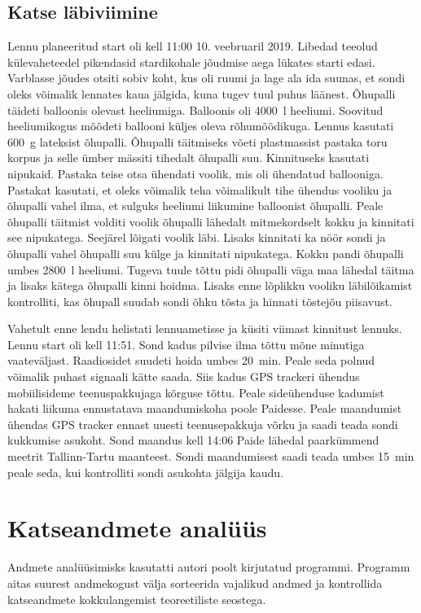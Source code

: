 \documentclass{trkut}%
\begin{document}
\section{Katse läbiviimine}
Lennu planeeritud start oli kell 11:00 10. veebruaril 2019. Libedad teeolud külevaheteedel pikendasid stardikohale jõudmise aega lükates starti edasi. Varblasse jõudes otsiti sobiv koht, kus oli ruumi ja lage ala ida suunas, et sondi oleks võimalik lennates kaua jälgida, kuna tugev tuul puhus läänest. Õhupalli täideti balloonis olevast heeliumiga. Balloonis oli \SI{4000}{l} heeliumi. Soovitud heeliumikogus mõõdeti ballooni küljes oleva rõhumõõdikuga. Lennus kasutati \SI{600}{g} lateksist õhupalli. Õhupalli täitmiseks võeti plastmassist pastaka toru korpus ja selle ümber mässiti tihedalt õhupalli suu. Kinnituseks kasutati nipukaid. Pastaka teise otsa ühendati voolik, mis oli ühendatud ballooniga. Pastakat kasutati, et oleks võimalik teha võimalikult tihe ühendus vooliku ja õhupalli vahel ilma, et sulguks heeliumi liikumine balloonist õhupalli. Peale õhupalli täitmist volditi voolik õhupalli lähedalt mitmekordselt kokku ja kinnitati see nipukatega. Seejärel lõigati voolik läbi. Lisaks kinnitati ka nöör sondi ja õhupalli vahel õhupalli suu külge ja kinnitati nipukatega. Kokku pandi õhupalli umbes \SI{2800}{l} heeliumi. Tugeva tuule tõttu pidi õhupalli väga maa lähedal täitma ja lisaks kätega õhupalli kinni hoidma. Lisaks enne lõplikku vooliku läbilõikamist kontrolliti, kas õhupall suudab sondi õhku tõsta ja hinnati tõstejõu piisavust.

Vahetult enne lendu helistati lennuametisse ja küsiti viimast kinnitust lennuks. Lennu start oli kell 11:51. Sond kadus pilvise ilma tõttu mõne minutiga vaateväljast. Raadiosidet suudeti hoida umbes \SI{20}{min}. Peale seda polnud võimalik puhast signaali kätte saada. Siis kadus GPS trackeri ühendus mobiilisideme teenuspakkujaga kõrguse tõttu. Peale sideühenduse kadumist hakati liikuma ennustatava maandumiskoha poole Paidesse. Peale maandumist ühendas GPS tracker ennast uuesti teenusepakkuja võrku ja saadi teada sondi kukkumise asukoht. Sond maandus kell 14:06 Paide lähedal paarkümmend meetrit Tallinn-Tartu maanteest. Sondi maandumisest saadi teada umbes \SI{15}{min} peale seda, kui kontrolliti sondi asukohta jälgija kaudu.






\chapter{Katseandmete analüüs}
Andmete analüüsimisks kasutatti autori poolt kirjutatud programmi. Programm aitas suurest andmekogust välja sorteerida vajalikud andmed ja kontrollida katseandmete kokkulangemist teoreetiliste seostega.
\end{document}
